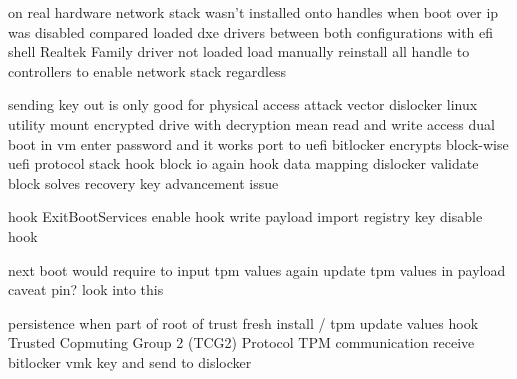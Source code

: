 on real hardware
network stack wasn't installed onto handles when boot over ip was disabled
compared loaded dxe drivers between both configurations with efi shell
Realtek Family driver not loaded
load manually
reinstall all handle to controllers to enable network stack regardless

sending key out is only good for physical access attack vector
dislocker linux utility
mount encrypted drive with decryption mean
read and write access
dual boot in vm
enter password and it works
port to uefi
bitlocker encrypts block-wise
uefi protocol stack
hook block io
again hook data mapping
dislocker validate block
solves recovery key advancement issue

hook ExitBootServices
enable hook
write payload
import registry key
disable hook

next boot would require to input tpm values again
update tpm values in payload
caveat pin? look into this

persistence when part of root of trust
fresh install / tpm update values
hook Trusted Copmuting Group 2 (TCG2) Protocol
TPM communication
receive bitlocker vmk key and send to dislocker